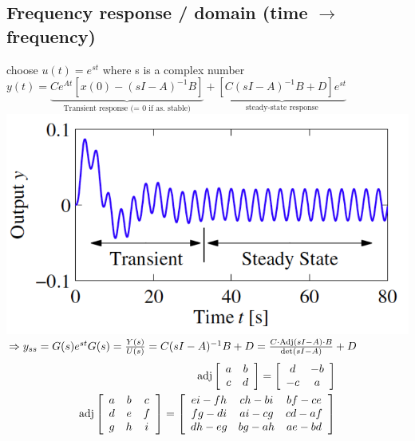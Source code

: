 \subsection{Frequency response / domain (time $\rightarrow$ frequency)}
choose $u(t) = e^{st}$ where s is a complex number\\
$ y(t) = \underbrace{Ce^{At} [x(0) - (sI - A)^{-1} B]}_{\text{Transient response (= 0 if as. stable)}}
+ \underbrace{[C(sI - A)^{-1} B + D]e^{st}}_{\text{steady-state response}}$\\
\includegraphics*[width = \linewidth]{src/images/transient_steady_state.png}
$\Rightarrow y_{ss} = G(s) e^{st}\\
G(s) = \frac{Y(s)}{U(s)} = C(sI - A)^{-1} B + D = \frac{C \cdot \text{Adj}(sI - A) \cdot B}{\text{det}(sI - A)} + D$\\
\begin{align*}
    \text{adj}\left[
        \begin{array}{c c}
            a & b\\
            c & d            
        \end{array}
    \right]
    = \left[
        \begin{array}{c c}
            d & -b\\
            -c & a
        \end{array}
    \right]
    \\
    \text{adj}\left[
        \begin{array}{c c c}
            a & b & c\\
            d & e & f\\
            g & h & i
        \end{array}
    \right]
    = \left[
        \begin{array}{c c c}
            ei-fh & ch-bi & bf-ce\\
            fg-di & ai-cg & cd-af\\
            dh-eg & bg-ah & ae-bd            
        \end{array}
    \right]
\end{align*}